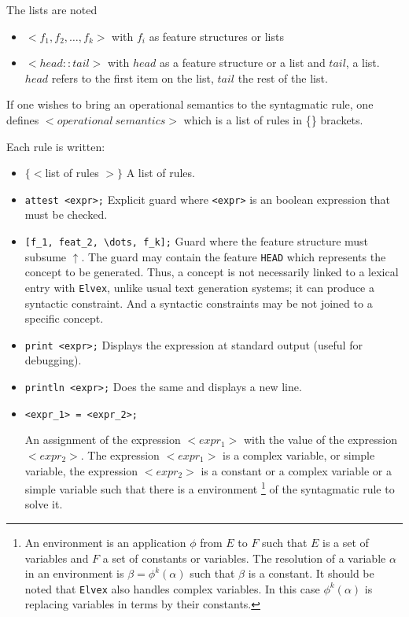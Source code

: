 \documentclass[11pt]{article}
\begin{document}
The lists are noted
\begin{itemize}
\item $<f_1, f_2, \dots, f_k>$ with $f_i$ as feature structures or lists
\item $<head::tail>$ with $head$ as a feature structure or a list and $tail$, a
  list. $head$ refers to the first item on the list, $tail$ the rest
  of the list.
\end{itemize}

If one wishes to bring an operational semantics to the syntagmatic
rule, one defines $<operational~semantics>$ which is a list of rules
in \{\} brackets.

Each rule is written:

\begin{itemize}

\item $\{<$list of rules $>\}$ A list of rules.

\item \verb#attest <expr>;# Explicit guard where \verb#<expr># is an
  boolean expression that must be checked.

\item \verb#[f_1, feat_2, \dots, f_k];# Guard where the feature
  structure must subsume $\uparrow$. The guard may contain the feature
  \verb#HEAD# which represents the concept to be generated. Thus, a
  concept is not necessarily linked to a lexical entry with
  \texttt{Elvex}, unlike usual text generation systems; it can produce
  a syntactic constraint. And a syntactic constraints may be not
  joined to a specific concept.

\item \verb#print <expr>;# Displays the expression at standard output
  (useful for debugging).

\item \verb#println <expr>;# Does the same and displays a new line.
  
\item  \verb#<expr_1> = <expr_2>;#
  
  An assignment of the expression $<expr_1>$ with the value of the
  expression $<expr_2>$. The expression $<expr_1>$ is a complex
  variable, or simple variable, the expression $<expr_2>$ is a constant
  or a complex variable or a simple variable such that there is a
  environment \footnote{An environment is an application $\phi$ from
    $E$ to $F$ such that $E$ is a set of variables and $F$ a set of
    constants or variables. The resolution of a variable $\alpha$ in
    an environment is $\beta = \phi^k(\alpha)$ such that $\beta$ is a
    constant. It should be noted that \texttt{Elvex} also handles
    complex variables. In this case $\phi^k(\alpha)$ is replacing
    variables in terms by their constants. } of the syntagmatic rule
  to solve it.
    

\end{itemize}
\end{document}
